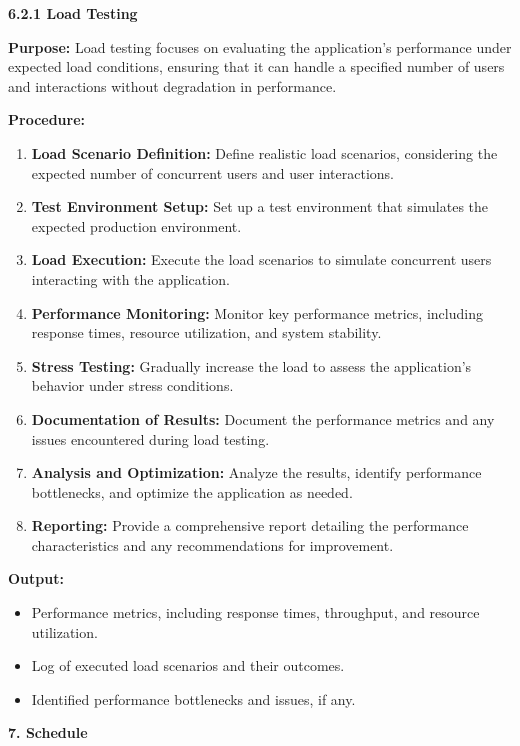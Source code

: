 \documentclass[
]{article}
\begin{document}
\textbf{6.2.1 Load Testing}

\textbf{Purpose:} Load testing focuses on evaluating the application's
performance under expected load conditions, ensuring that it can handle
a specified number of users and interactions without degradation in
performance.

\textbf{Procedure:}

\begin{enumerate}
\def\labelenumi{\arabic{enumi}.}
\item
  \textbf{Load Scenario Definition:} Define realistic load scenarios,
  considering the expected number of concurrent users and user
  interactions.
\item
  \textbf{Test Environment Setup:} Set up a test environment that
  simulates the expected production environment.
\item
  \textbf{Load Execution:} Execute the load scenarios to simulate
  concurrent users interacting with the application.
\item
  \textbf{Performance Monitoring:} Monitor key performance metrics,
  including response times, resource utilization, and system stability.
\item
  \textbf{Stress Testing:} Gradually increase the load to assess the
  application's behavior under stress conditions.
\item
  \textbf{Documentation of Results:} Document the performance metrics
  and any issues encountered during load testing.
\item
  \textbf{Analysis and Optimization:} Analyze the results, identify
  performance bottlenecks, and optimize the application as needed.
\item
  \textbf{Reporting:} Provide a comprehensive report detailing the
  performance characteristics and any recommendations for improvement.
\end{enumerate}

\textbf{Output:}

\begin{itemize}
\item
  Performance metrics, including response times, throughput, and
  resource utilization.
\item
  Log of executed load scenarios and their outcomes.
\item
  Identified performance bottlenecks and issues, if any.
\end{itemize}


\protect\hypertarget{Amn}{}{}\textbf{7. Schedule}
\end{document}

